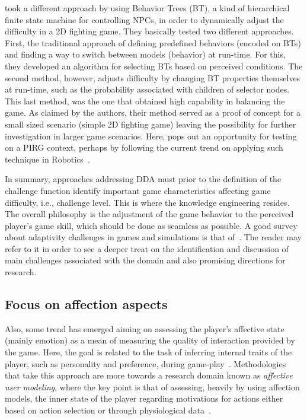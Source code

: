 \cite{ddaBT} took a different approach by using Behavior Trees (BT), a kind of hierarchical finite state machine for controlling NPCs, in order to dynamically adjust the difficulty in a 2D fighting game. They basically tested two different approaches. First, the traditional approach of defining predefined behaviors (encoded on BTs) and finding a way to switch between models (behavior) at run-time. For this, they developed an algorithm for selecting BTs based on perceived conditions. The second method, however, adjusts difficulty by changing BT properties themselves at run-time, such as the probability associated with children of selector nodes. This last method, was the one that obtained high capability in balancing the game. As claimed by the authors, their method served as a proof of concept for a small sized scenario (simple 2D fighting game) leaving the possibility for further investigation in larger game scenarios. Here, pops out an opportunity for testing on a PIRG context, perhaps by following the current trend on applying such technique in Robotics~\cite{scheper2015behavior, pereira2015framework, marzinotto2014towards}.

In summary, approaches addressing DDA must prior to the definition of the challenge function identify important game characteristics affecting game difficulty, i.e., challenge level. This is where the knowledge engineering resides. The overall philosophy is the adjustment of the game behavior to the perceived player's game skill, which should be done as seamless as possible. A good survey about adaptivity challenges in games and simulations is that of~\cite{lopes2011adaptivity}. The reader may refer to it in order to see a deeper treat on the identification and discussion of main challenges associated with the domain and also promising directions for research.

\subsection{Focus on affection aspects}\label{affectmodeling}
Also, some trend has emerged aiming on assessing the player's affective state (mainly emotion) as a mean of measuring the quality of interaction provided by the game. Here, the goal is related to the task of inferring internal traits of the player, such as personality and preference, during game-play~\cite{van2009psychologically}. Methodologies that take this approach are more towards a research domain known as \textit{affective user modeling}, where the key point is that of assessing, heavily by using affection models, the inner state of the player regarding motivations for actions either based on action selection or through physiological data~\cite{van2009psychologically}.

